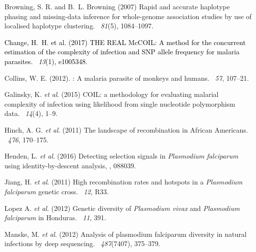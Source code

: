\documentclass{article}
\begin{document}
\begin{thebibliography}{}

Browning, S. R. and B.~L. Browning (2007)
\newblock Rapid and accurate haplotype phasing and missing-data inference for
  whole-genome association studies by use of localised haplotype clustering.
~{\em 81\/}(5), 1084--1097.

\textcolor{black}{Change, H.~H. et al. (2017)
\newblock THE REAL McCOIL: A method for the concurrent estimation of the complexity of infection and SNP allele frequency for malaria parasites.
~{\em 13\/}(1), e1005348.}

Collins, W. E. (2012).
: A malaria parasite of monkeys and humans.
~{\em 57\/}, 107--21.

Galinsky, K. {\em et al}. (2015)
\newblock COIL: a methodology for evaluating malarial complexity of infection using likelihood from single nucleotide polymorphism data.
~{\em14\/}(4), 1--9.

Hinch, A. G. {\em et al}. (2011)
\newblock The landscape of recombination in African Americans.
~{\em 476}, 170--175.

Henden, L. {\em et al}. (2016)
\newblock Detecting selection signals in {\it Plasmodium falciparum} using identity-by-descent analysis,
, 088039.

Jiang, H. {\em et al}. (2011)
\newblock High recombination rates and hotspots in a {\it Plasmodium falciparum} genetic cross.
~{\em 12}, R33.

Lopez A. {\em et al}. (2012)
\newblock Genetic diversity of {\it Plasmodium vivax} and {\it Plasmodium falciparum} in Honduras.
~{\em 11}, 391.

Manske, M. {\em et al}. (2012)
\newblock Analysis of plasmodium falciparum diversity in natural infections by deep sequencing.
~{\em 487\/}(7407), 375--379.


\end{thebibliography}
\end{document}
